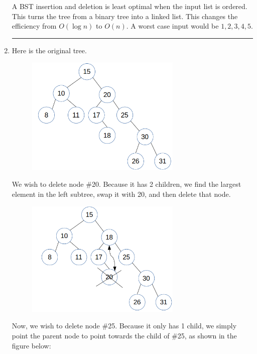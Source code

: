 \documentclass{article}
\begin{document}
\begin{enumerate}
A BST insertion and deletion is least optimal when the input list is ordered. This turns the tree from a binary tree into a linked list. This changes the efficiency from $O(\log n)$ to $O(n)$. A worst case input would be $1,2,3,4,5$. 

\noindent\rule{8cm}{0.4pt}


\item
Here is the original tree. 

\begin{figure}[H]

	\includegraphics[width=0.7\textwidth]{P11/full}
\end{figure}



We wish to delete node \#20. Because it has 2 children, we find the largest element in the left subtree, swap it with 20, and then delete that node. 
 
\begin{figure}[H]
	\includegraphics[width=0.7\textwidth]{P11/20}
\end{figure}


Now, we wish to delete node \#25. Because it only has 1 child, we simply point the parent node to point towards the child of \#25, as shown in the figure below: 


\end{enumerate}
\end{document}
